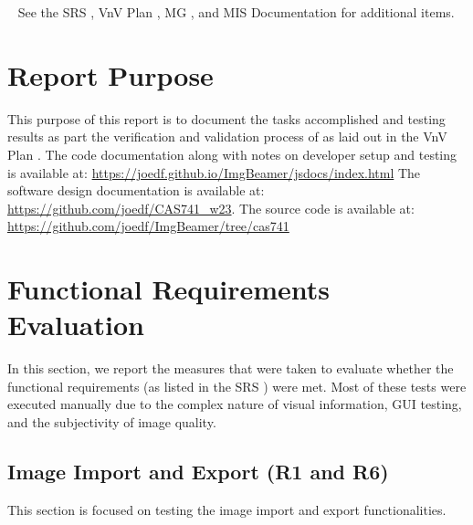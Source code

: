 \documentclass[12pt, titlepage]{article}
\begin{document}
~\newline
\noindent See the SRS \cite{SRS}, VnV Plan \cite{VnV_plan}, MG \cite{MG},
and MIS \cite{MIS} Documentation for additional items.

\newpage

\tableofcontents

\listoftables %

\listoffigures %

\newpage


\section{Report Purpose}
This purpose of this report is to document the tasks accomplished and
testing results as part the verification and validation process of \progname{}
as laid out in the VnV Plan \cite{VnV_plan}. The code documentation along with notes
on developer setup and testing is available at:
\url{https://joedf.github.io/ImgBeamer/jsdocs/index.html} The software design documentation
is available at: \url{https://github.com/joedf/CAS741_w23}. The source code is
available at: \url{https://github.com/joedf/ImgBeamer/tree/cas741}

\section{Functional Requirements Evaluation}
In this section, we report the measures that were taken to evaluate whether the
functional requirements (as listed in the SRS \cite{SRS}) were met.
Most of these tests were executed manually due to the complex nature of visual information, GUI testing, and
the subjectivity of image quality.

\subsection{Image Import and Export (R1 and R6)} \label{ss_inout}
This section is focused on testing the image import and export functionalities.
\end{document}
